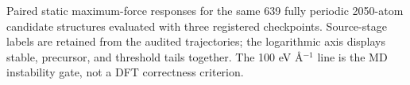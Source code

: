 Paired static maximum-force responses for the same 639 fully periodic 2050-atom candidate structures evaluated with three registered checkpoints. Source-stage labels are retained from the audited trajectories; the logarithmic axis displays stable, precursor, and threshold tails together. The 100 eV Å$^{-1}$ line is the MD instability gate, not a DFT correctness criterion.

